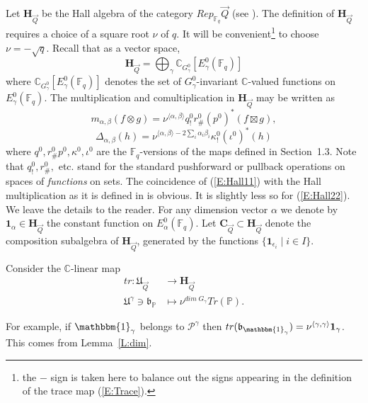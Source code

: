 \documentclass[a4paper,10pt]{amsart}
\def\H{\mathbf{H}}
\def\a{\alpha}
\def\C{\mathbb{C}}
\def\fq{\mathbb{F}_q}
\def\bo{\mathfrak{b}}
\numberwithin{equation}{section}
\begin{document}
Let $\mathbf{H}_{\vec{Q}}$ be the Hall algebra of the category $Rep_{\fq}\vec{Q}$ (see \cite{Trieste}). The definition of $\H_{\vec{Q}}$ requires a choice of a square root $\nu$ of $q$. It will be convenient\footnote{the $-$ sign is taken here to balance out the signs appearing in the definition of the trace map (\ref{E:Trace}).} to choose $\nu=-\sqrt{q}$. Recall that as a vector space,
$$\H_{\vec{Q}}=\bigoplus_{\gamma} \C_{G^0_{\gamma}}[E^0_{\gamma}(\fq)]$$
where $\C_{G^0_{\gamma}}[E^0_{\gamma}(\fq)]$ denotes the set of $G^0_{\gamma}$-invariant $\C$-valued functions
on $E^0_{\gamma}(\fq)$. The multiplication and comultiplication in $\H_{\vec{Q}}$ may be written as
\begin{equation}\label{E:Hall11}
m_{\a,\beta}(f\otimes g)=\nu^{\langle \a,\beta\rangle} q^0_{!} r^0_{\#}(p^0)^* (f \boxtimes g),
\end{equation}
\begin{equation}\label{E:Hall22}
\Delta_{\a,\beta}(h)=\nu^{\langle \a,\beta\rangle -2\sum_i \a_i \beta_i} \kappa^0_! (\iota^0)^*(h)
\end{equation}
where $q^0,r^0_{\#} p^0,\kappa^0,\iota^0$ are the $\fq$-versions of the maps defined in Section~1.3. Note that $q^0_!, r_\#^0,$ etc. stand for the standard pushforward or pullback operations on spaces of \textit{functions} on sets.
The coincidence of (\ref{E:Hall11}) with the Hall multiplication as it is defined in \cite[Lecture~1]{Trieste}  is obvious. It is slightly less so for (\ref{E:Hall22}). We leave the details to the reader. For any dimension vector $\a$ we denote by $\mathbf{1}_{\a} \in \mathbf{H}_{\vec{Q}}$ the constant function on $E^0_{\a}(\fq)$.
Let $\mathbf{C}_{\vec{Q}} \subset \H_{\vec{Q}}$ denote the composition subalgebra of $\H_{\vec{Q}}$, generated by the functions $\{\mathbf{1}_{\epsilon_i}\;|\;i \in I\}$.

\vspace{.1in}

Consider the $\C$-linear map 
\begin{equation}
\begin{split}
tr: \mathfrak{U}_{\vec{Q}} &\to \H_{\vec{Q}}\\
\mathfrak{U}^{\gamma} \ni \bo_{\mathbb{P}} &\mapsto \nu^{dim\;G_{\gamma}} Tr(\mathbb{P}).
\end{split}
\end{equation}

For example, if $\mathbbm{1}_{\gamma}$ belongs to $\mathcal{P}^{\gamma}$ then $tr(\bo_{\mathbbm{1}_{\gamma}})=\nu^{\langle \gamma, \gamma \rangle} \mathbf{1}_{\gamma}$. This comes from Lemma~\ref{L:dim}.
\end{document}
